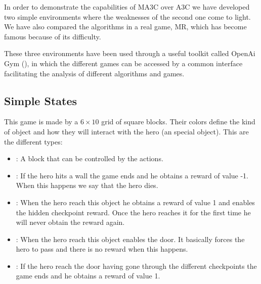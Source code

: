 In order to demonstrate the capabilities of \ac{MA3C} over \ac{A3C} we have developed two simple environments where the
weaknesses of the second one come to light.
We have also compared the algorithms in a real game, \acl{MR}, which has become famous because of its difficulty.

These three environments have been used through a useful toolkit called OpenAi Gym (\cite{gym}), in which the different games
can be accessed by a common interface facilitating the analysis of different algorithms and games.


\subsection{Simple States\label{subsec:SimpleStates}}

This game is made by a $6 \times 10$ grid of square blocks.
Their colors define the kind of object and how they will interact with the hero (an special object).
This are the different types:
\begin{itemize}
  \item {}: A block that can be controlled by the actions.
  \item {}: If the hero hits a wall the game ends and he obtains a reward of value -1.
  When this happens we say that the hero dies.
  \item {}: When the hero reach this object he obtains a reward of value 1 and enables the hidden
  checkpoint reward.
  Once the hero reaches it for the first time he will never obtain the reward again.
  \item {}: When the hero reach this object enables the door.
  It basically forces the hero to pass and there is no reward when this happens.
  \item {}: If the hero reach the door having gone through the different checkpoints the game ends and
  he obtains a reward of value 1.
\end{itemize}

